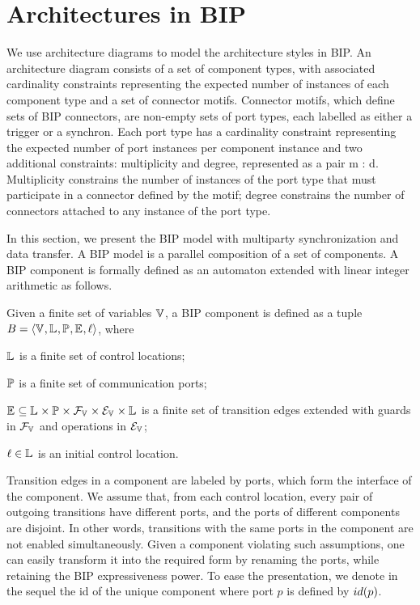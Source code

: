 
\section{Architectures in BIP}
\label{sec:rsd}


We use architecture diagrams \cite{} to model the architecture styles in BIP.
An architecture diagram consists of a set of component types, with associated cardinality constraints representing the
expected number of instances of each component type and a set of connector motifs.
Connector motifs, which define sets of BIP connectors, are non-empty sets of port types, each labelled as either a trigger or a synchron.
Each port type has a cardinality constraint representing the expected number of port instances
per component instance and two additional constraints: multiplicity and degree,
represented as a pair m : d. Multiplicity constrains the number of instances of
the port type that must participate in a connector defined by the motif; degree
constrains the number of connectors attached to any instance of the port type.


In this section, we present the BIP model with multiparty synchronization and data transfer.
%
%
A BIP model is a parallel composition of a set of components.
A BIP component is formally defined as an automaton extended with linear integer arithmetic as follows.

\begin{definition} 
\label{component-def}
Given a finite set of variables $\mathbb{V}_{}$, a BIP component is defined as a tuple
 $B_{} = \langle{\ensuremath{\mathbb{V}_{}}, \ensuremath{\mathbb{L}_{}}, \ensuremath{\mathbb{P}_{}}, \ensuremath{\mathbb{E}_{}}, \ell}\rangle$, where
\begin{inparaenum}
\item $\mathbb{L}_{}$ is a finite set of control locations;
\item $\mathbb{P}_{}$ is a finite set of communication ports;
\item $\mathbb{E}_{} \subseteq \mathbb{L}_{} \times \mathbb{P}_{} \times \mathcal{F}_{\mathbb{V}_{}} \times \mathcal{E}_{\mathbb{V}_{}} \times \mathbb{L}_{}$
 is a finite set of transition edges extended with guards in $\mathcal{F}_{\mathbb{V}_{}}$
 and operations in $\mathcal{E}_{\mathbb{V}_{}}$;
\item $\ell \in \mathbb{L}_{}$ is an initial control location.
\end{inparaenum}
\end{definition}


Transition edges in a component are labeled by ports, which form the interface of the component.
 We assume that, from each control location,
 every pair of outgoing transitions have different ports,
 and the ports of different components are disjoint.
 In other words, transitions with the same ports in the component are not enabled simultaneously.
 Given a component violating such assumptions,
 one can easily transform it into the required form by renaming the ports,
 while retaining the BIP expressiveness power.
 To ease the presentation, we denote in the sequel the id of the unique component
 where port $p$ is defined by ${id({p})}$.

